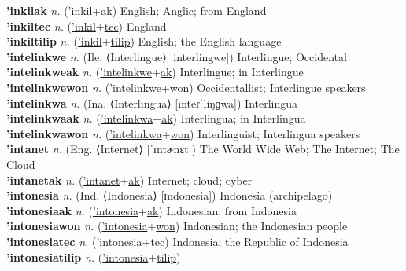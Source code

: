 \textbf{'inkilak} \textit{n.} (\hyperref['inkil]{'inkil}+\hyperref[ak]{ak})
English; Anglic; from England \label{'inkilak} \\
\textbf{'inkiltec} \textit{n.} (\hyperref['inkil]{'inkil}+\hyperref[tec]{tec})
England \label{'inkiltec} \\
\textbf{'inkiltilip} \textit{n.} (\hyperref['inkil]{'inkil}+\hyperref[tilip]{tilip})
English; the English language \label{'inkiltilip} \\
\textbf{'intelinkwe} \textit{n.} (Ile. ⟨Interlingue⟩ [interlingwe])
Interlingue; Occidental \label{'intelinkwe} \\
\textbf{'intelinkweak} \textit{n.} (\hyperref['intelinkwe]{'intelinkwe}+\hyperref[ak]{ak})
Interlingue; in Interlingue \label{'intelinkweak} \\
\textbf{'intelinkwewon} \textit{n.} (\hyperref['intelinkwe]{'intelinkwe}+\hyperref[won]{won})
Occidentallist; Interlingue speakers \label{'intelinkwewon} \\
\textbf{'intelinkwa} \textit{n.} (Ina. ⟨Interlingua⟩ [inteɾˈliŋɡwa])
Interlingua \label{'intelinkwa} \\
\textbf{'intelinkwaak} \textit{n.} (\hyperref['intelinkwa]{'intelinkwa}+\hyperref[ak]{ak})
Interlingua; in Interlingua \label{'intelinkwaak} \\
\textbf{'intelinkwawon} \textit{n.} (\hyperref['intelinkwa]{'intelinkwa}+\hyperref[won]{won})
Interlinguist; Interlingua speakers \label{'intelinkwawon} \\
\textbf{'intanet} \textit{n.} (Eng. ⟨Internet⟩ [ˈɪntɚnɛt])
The World Wide Web; The Internet; The Cloud \label{'intanet} \\
\textbf{'intanetak} \textit{n.} (\hyperref['intanet]{'intanet}+\hyperref[ak]{ak})
Internet; cloud; cyber \label{'intanetak} \\
\textbf{'intonesia} \textit{n.} (Ind. ⟨Indonesia⟩ [ɪndonesia])
Indonesia (archipelago) \label{'intonesia} \\
\textbf{'intonesiaak} \textit{n.} (\hyperref['intonesia]{'intonesia}+\hyperref[ak]{ak})
Indonesian; from Indonesia \label{'intonesiaak} \\
\textbf{'intonesiawon} \textit{n.} (\hyperref['intonesia]{'intonesia}+\hyperref[won]{won})
Indonesian; the Indonesian people \label{'intonesiawon} \\
\textbf{'intonesiatec} \textit{n.} (\hyperref['intonesia]{'intonesia}+\hyperref[tec]{tec})
Indonesia; the Republic of Indonesia \label{'intonesiatec} \\
\textbf{'intonesiatilip} \textit{n.} (\hyperref['intonesia]{'intonesia}+\hyperref[tilip]{tilip})
